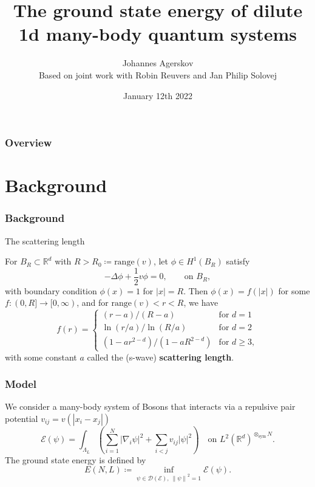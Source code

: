 \documentclass{beamer}[10]
\title{The ground state energy of dilute 1d many-body quantum systems}
\subtitle{}
\author{Johannes Agerskov\\\vspace{0.2 cm}
	\scriptsize{Based on joint work with Robin Reuvers and Jan Philip Solovej}}
\institute{QMATH \\ University of Copenhagen}
\date{January 12th 2022}
\newcommand{\norm}[1]{\left\lVert #1 \right\rVert}
\newcommand{\abs}[1]{\left\lvert #1 \right\rvert}
\newcommand{\R}{\mathbb{R}}
\begin{document}
\frame{\titlepage \vspace{-0.5cm}
}

\frame
{
\frametitle{Overview}
\tableofcontents%
}

\section{Background}

\begin{frame}
\frametitle{Background}
\begin{block}{The scattering length}
	\begin{Theorem}
		For $ B_R\subset \R^d $ with $ R>R_0\coloneqq\text{range}(v) $, let $ \phi\in H^1(B_{R}) $ satisfy
	 \begin{equation}
		 -\Delta \phi +\frac12 v\phi=0,\qquad \text{on }B_R,
		 \end{equation}
		 with boundary condition $ \phi(x)=1 $ for $ \abs{x}=R$.
		 Then $ \phi(x)=f(\abs{x}) $ for some $ f:(0,R]\to [0,\infty) $, and for $ \text{range}(v)<r<R $, we have \begin{equation}
		 f(r)=\begin{cases}
		 (r-a)/(R-a) &\text{for }d=1\\
		 \ln(r/a)/\ln(R/a) &\text{for }d=2\\
		 (1-ar^{2-d})/(1-aR^{2-d})&\text{for }d\geq 3,
		 \end{cases}
		 \end{equation}
		 with some constant $ a $ called the (s-wave) \textbf{scattering length}.
	\end{Theorem}
\end{block}	
\end{frame}

\begin{frame}
	\frametitle{Model}
	We consider a many-body system of Bosons that interacts via a repulsive pair potential $ v_{ij}=v(\abs{x_i-x_j}) $\begin{equation}
	\mathcal{E}(\psi)=\int_{\Lambda_L}\left(\sum_{i=1}^{N}\abs{\nabla_i\psi}^2+\sum_{i<j} v_{ij}\abs{\psi}^2\right)\quad \text{on } L^2(\R^d)^{\otimes_{\text{sym}} N}.
	\end{equation}
	The ground state energy is defined by 
	$$
	E(N,L)\coloneqq\inf_{\psi\in\mathcal{D}(\mathcal{E}),\ \norm{\psi}^2=1}\mathcal{E}(\psi).
	$$
\end{frame}
\end{document}
